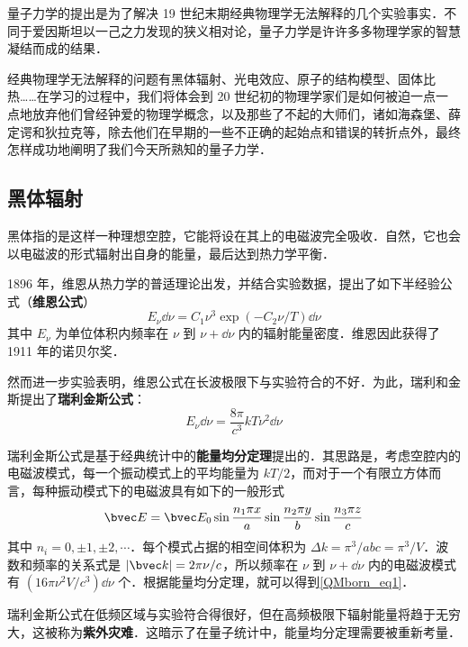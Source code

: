 
量子力学的提出是为了解决 19 世纪末期经典物理学无法解释的几个实验事实．不同于爱因斯坦以一己之力发现的狭义相对论，量子力学是许许多多物理学家的智慧凝结而成的结果．

经典物理学无法解释的问题有黑体辐射、光电效应、原子的结构模型、固体比热……在学习的过程中，我们将体会到 20 世纪初的物理学家们是如何被迫一点一点地放弃他们曾经钟爱的物理学概念，以及那些了不起的大师们，诸如海森堡、薛定谔和狄拉克等，除去他们在早期的一些不正确的起始点和错误的转折点外，最终怎样成功地阐明了我们今天所熟知的量子力学．

\subsection{黑体辐射}
黑体指的是这样一种理想空腔，它能将设在其上的电磁波完全吸收．自然，它也会以电磁波的形式辐射出自身的能量，最后达到热力学平衡．

1896 年，维恩从热力学的普适理论出发，并结合实验数据，提出了如下半经验公式（\textbf{维恩公式}）
\begin{equation}
E_\nu \dd \nu=C_1\nu^3 \exp(-C_2 \nu /T) \dd \nu
\end{equation}
其中 $E_\nu$ 为单位体积内频率在 $\nu$ 到 $\nu+\dd \nu$ 内的辐射能量密度．维恩因此获得了 1911 年的诺贝尔奖．

然而进一步实验表明，维恩公式在长波极限下与实验符合的不好．为此，瑞利和金斯提出了\textbf{瑞利金斯公式}：
\begin{equation}\label{QMborn_eq1}
E_\nu \dd \nu=\frac{8\pi}{c^3}kT\nu^2 \dd \nu
\end{equation}

瑞利金斯公式是基于经典统计中的\textbf{能量均分定理}提出的．其思路是，考虑空腔内的电磁波模式，每一个振动模式上的平均能量为 $kT/2$，而对于一个有限立方体而言，每种振动模式下的电磁波具有如下的一般形式
\begin{equation}
\bvec E=\bvec E_0 \sin\frac{n_1\pi x}{a} \sin\frac{n_2\pi y}{b}\sin \frac{n_3\pi z}{c}
\end{equation}
其中 $n_i=0,\pm 1,\pm 2,\cdots$．每个模式占据的相空间体积为 $\Delta k=\pi^3/abc=\pi^3/V$．波数和频率的关系式是 $|\bvec k| = 2\pi\nu/c$，所以频率在 $\nu$ 到 $\nu+\dd \nu$ 内的电磁波模式有 $(16\pi \nu^2V/c^3 )\dd \nu$ 个．根据能量均分定理，就可以得到\autoref{QMborn_eq1}．

瑞利金斯公式在低频区域与实验符合得很好，但在高频极限下辐射能量将趋于无穷大，这被称为\textbf{紫外灾难}．这暗示了在量子统计中，能量均分定理需要被重新考量．

